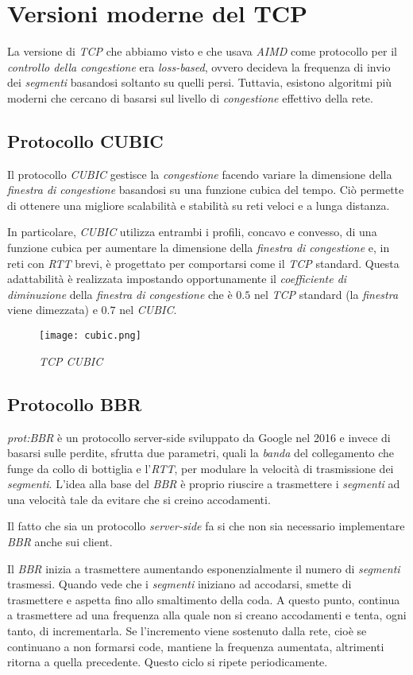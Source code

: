 \section{Versioni moderne del TCP}
La versione di \emph{TCP} che abbiamo visto e che usava \emph{AIMD} come
protocollo per il \emph{controllo della congestione} era \emph{loss-based},
ovvero decideva la frequenza di invio dei \emph{segmenti} basandosi soltanto
su quelli persi. Tuttavia, esistono algoritmi più moderni che cercano di
basarsi sul livello di \emph{congestione} effettivo della rete.

\subsection{Protocollo CUBIC}
Il protocollo \emph{CUBIC} gestisce la \emph{congestione} facendo variare la
dimensione della \emph{finestra di congestione} basandosi su una funzione
cubica del tempo. Ciò permette di ottenere una migliore scalabilità e
stabilità su reti veloci e a lunga distanza.

In particolare, \emph{CUBIC} utilizza entrambi i profili, concavo e convesso,
di una funzione cubica per aumentare la dimensione della \emph{finestra di
congestione} e, in reti con \emph{RTT} brevi, è progettato per comportarsi
come il \emph{TCP} standard. Questa adattabilità è realizzata impostando
opportunamente il \emph{coefficiente di diminuzione} della \emph{finestra di
congestione} che è $0.5$ nel \emph{TCP} standard (la \emph{finestra} viene
dimezzata) e $0.7$ nel \emph{CUBIC}.

\begin{figure}[hb]
    \centering
    \texttt{[image: cubic.png]}
    \caption{\emph{TCP CUBIC}}
\end{figure}

\subsection{Protocollo BBR}
\emph{\gls{prot:BBR}} è un protocollo server-side sviluppato da Google nel 2016
e invece di basarsi sulle perdite, sfrutta due parametri, quali la \emph{banda}
del collegamento che funge da collo di bottiglia e l'\emph{RTT}, per modulare la
velocità di trasmissione dei \emph{segmenti}. L'idea alla base del \emph{BBR}
è proprio riuscire a trasmettere i \emph{segmenti} ad una velocità tale da
evitare che si creino accodamenti.

\begin{note}
    Il fatto che sia un protocollo \emph{server-side} fa si che non sia
    necessario implementare \emph{BBR} anche sui client.
\end{note}\noindent
Il \emph{BBR} inizia a trasmettere aumentando esponenzialmente il numero
di \emph{segmenti} trasmessi. Quando vede che i \emph{segmenti} iniziano ad
accodarsi, smette di trasmettere e aspetta fino allo smaltimento della coda.
A questo punto, continua a trasmettere ad una frequenza alla quale non si
creano accodamenti e tenta, ogni tanto, di incrementarla. Se
l'incremento viene sostenuto dalla rete, cioè se continuano a non
formarsi code, mantiene la frequenza aumentata, altrimenti ritorna a quella
precedente. Questo ciclo si ripete periodicamente.

